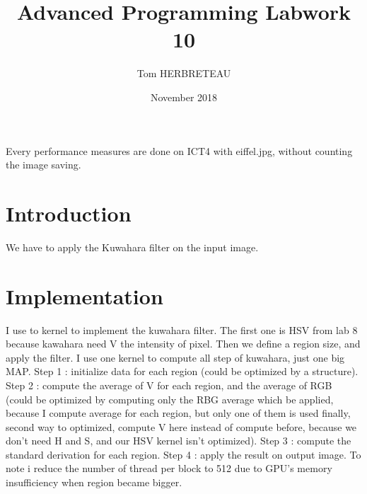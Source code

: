 \documentclass{article}
\title{Advanced Programming Labwork 10}
\author{Tom HERBRETEAU }
\date{November 2018}
\begin{document}
\maketitle
Every performance measures are done on ICT4 with eiffel.jpg, without counting the image saving.
\section{Introduction}
We have to apply the Kuwahara filter on the input image.
\section{Implementation}
I use to kernel to implement the kuwahara filter. The first one is HSV from lab 8 because kawahara need V the intensity of pixel. Then we define a region size, and apply the filter.
I use one kernel to compute all step of kuwahara, just one big MAP. 
Step 1 : initialize data for each region (could be optimized by a structure).
Step 2 : compute the average of V for each region, and the average of RGB (could be optimized by computing only the RBG average which be applied, because I compute average for each region, but only one of them is used finally, second way to optimized, compute V here instead of compute before, because we don't need H and S, and our HSV kernel isn't optimized).
Step 3 : compute the standard derivation for each region.
Step 4 : apply the result on output image.
To note i reduce the number of thread per block to 512 due to GPU's memory insufficiency when region became bigger.
\end{document}
